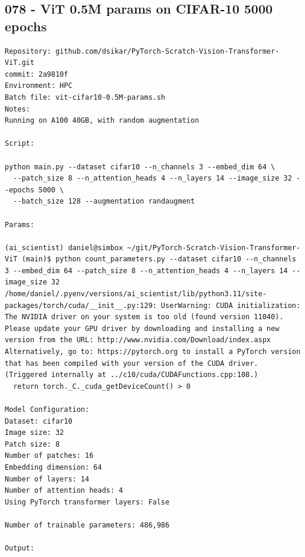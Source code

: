 \subsection{078 - ViT 0.5M params on CIFAR-10 5000 epochs}
\label{app_res:078}
\begin{verbatim}
Repository: github.com/dsikar/PyTorch-Scratch-Vision-Transformer-ViT.git
commit: 2a9810f
Environment: HPC 
Batch file: vit-cifar10-0.5M-params.sh
Notes: 
Running on A100 40GB, with random augmentation

Script:

python main.py --dataset cifar10 --n_channels 3 --embed_dim 64 \
  --patch_size 8 --n_attention_heads 4 --n_layers 14 --image_size 32 --epochs 5000 \
  --batch_size 128 --augmentation randaugment

Params: 

(ai_scientist) daniel@simbox ~/git/PyTorch-Scratch-Vision-Transformer-ViT (main)$ python count_parameters.py --dataset cifar10 --n_channels 3 --embed_dim 64 --patch_size 8 --n_attention_heads 4 --n_layers 14 --image_size 32 
/home/daniel/.pyenv/versions/ai_scientist/lib/python3.11/site-packages/torch/cuda/__init__.py:129: UserWarning: CUDA initialization: The NVIDIA driver on your system is too old (found version 11040). Please update your GPU driver by downloading and installing a new version from the URL: http://www.nvidia.com/Download/index.aspx Alternatively, go to: https://pytorch.org to install a PyTorch version that has been compiled with your version of the CUDA driver. (Triggered internally at ../c10/cuda/CUDAFunctions.cpp:108.)
  return torch._C._cuda_getDeviceCount() > 0

Model Configuration:
Dataset: cifar10
Image size: 32
Patch size: 8
Number of patches: 16
Embedding dimension: 64
Number of layers: 14
Number of attention heads: 4
Using PyTorch transformer layers: False

Number of trainable parameters: 486,986

Output:



\end{verbatim}

